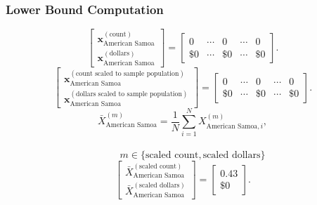 \subsubsection{Lower Bound Computation}
\[
\begin{bmatrix}
\mathbf{x}_{\text{American Samoa}}^{(\text{count})}\\
\mathbf{x}_{\text{American Samoa}}^{(\text{dollars})}
\end{bmatrix}
=
\begin{bmatrix}
0 & \cdots & 0 & \cdots & 0\\
\$0 & \cdots & \$0 & \cdots & \$0
\end{bmatrix}.
\]
\[
\begin{bmatrix}
\mathbf{x}_{\text{American Samoa}}^{(\text{count scaled to sample population})}\\
\mathbf{x}_{\text{American Samoa}}^{(\text{dollars scaled to sample population})}
\end{bmatrix}
=
\begin{bmatrix}
0 & \cdots & 0 & \cdots & 0\\
\$0 & \cdots & \$0 & \cdots & \$0
\end{bmatrix}.
\]
\[
\bar{X}_{\text{American Samoa}}^{(m)}
= \frac{1}{N}\sum_{i=1}^{N} X_{\text{American Samoa},i}^{(m)},
\]
\\
\[
\qquad
m \in \{\text{scaled count},\text{scaled dollars}\}
\]
\[
\begin{bmatrix}
\bar{X}_{\text{American Samoa}}^{(\text{scaled count})}\\
\bar{X}_{\text{American Samoa}}^{(\text{scaled dollars})}
\end{bmatrix}
=
\begin{bmatrix}
0.43\\
\$0
\end{bmatrix}.
\]
